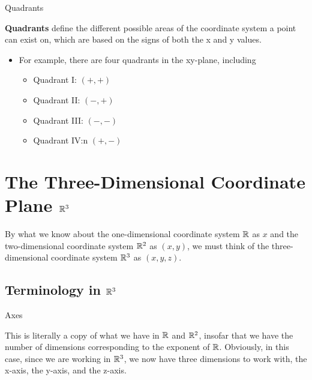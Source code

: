 \documentclass{report}
\begin{document}
\begin{sloppypar}
\begin{definition}
  Quadrants
\end{definition}
\textbf{Quadrants} define the different
possible areas of the coordinate system a
point can exist on, which are based on
the signs of both the x and y values.
\begin{itemize}
  \item For example, there are
        four quadrants in the xy-plane, including
        \begin{itemize}
          \item Quadrant I: $ (+, +)$
          \item Quadrant II: $ (-, +)$
          \item Quadrant III: $ (-, -)$
          \item Quadrant IV:n $ (+, -)$

        \end{itemize}

\end{itemize}

\section{The Three-Dimensional Coordinate
  Plane $\mathbb{R}^{3}$}

By what we know about the one-dimensional
coordinate system $ \mathbb{R}$ as $x$ and the
two-dimensional coordinate system $\mathbb{R}^{2}$
as $ (x, y)$, we must think of the
three-dimensional coordinate system $\mathbb{R}^{3}$
as $ (x, y, z)$.
\subsection{Terminology in $ \mathbb{R}^{3} $}

\begin{definition}
  Axes
\end{definition}

This is literally a copy of what we have
in $ \mathbb{R} $ and $ \mathbb{R}^{2} $, insofar that
we have the number of dimensions corresponding
to the exponent of $ \mathbb{R} $. Obviously, in
this case, since we are working in $ \mathbb{R}^{3} $,
we now have three dimensions to work with,
the x-axis, the y-axis, and the z-axis.


\end{sloppypar}
\end{document}
